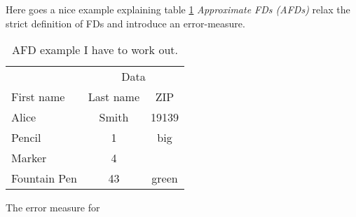 Here goes a nice example explaining table \ref{tab:example-afd-necessity}
\emph{Approximate FDs (AFDs)} relax the strict definition of FDs and introduce an error-measure.  

\begin{table}[h]
	\centering
	\begin{tabular}{lcc}
		\toprule
		& \multicolumn{2}{c}{Data} \\ \cmidrule(lr){2-3}
    First name & Last name & ZIP \\
		\midrule
    Alice & Smith & 19139 \\
		Pencil & 1 & big \\
		Marker & 4 &  \\
    Fountain Pen & 43 & green \\
		\bottomrule
	\end{tabular}
	\caption{AFD example I have to work out.}
	\label{tab:example-afd-necessity}
\end{table}

The error measure for 
